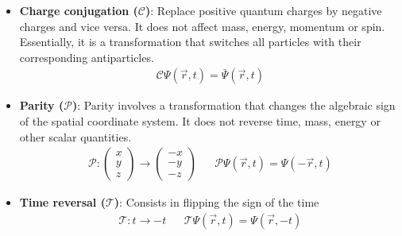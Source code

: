 \begin{itemize}
	\item \textbf{Charge conjugation ($\mathcal{C}$)}: Replace positive quantum charges by negative charges and vice versa. %
										It does not affect mass, energy, momentum or spin. Essentially, it is a transformation that switches
										all particles with their corresponding antiparticles.
										\begin{align*}
											\mathcal{C} \Psi(\overrightarrow{r}, t) = \bar{\Psi}(\overrightarrow{r}, t)
										\end{align*}
										 
	\item \textbf{Parity ($\mathcal{P}$)}: Parity involves a transformation that changes the algebraic sign of the spatial coordinate system. 
								It does not reverse time, mass, energy or other scalar quantities.
								\begin{align*}
									\mathcal{P}:\begin{pmatrix} x \\ y \\ z \end{pmatrix} \rightarrow \begin{pmatrix} -x \\ -y \\ -z \end{pmatrix} &&
									\mathcal{P} \Psi(\overrightarrow{r}, t) = \Psi(-\overrightarrow{r}, t)
								\end{align*}
	\item \textbf{Time reversal ($\mathcal{T}$)}: Consists in flipping the sign of the time
								\begin{align*}
									\mathcal{T}:t \rightarrow -t &&
									\mathcal{T} \Psi (\overrightarrow{r}, t) = \Psi (\overrightarrow{r}, -t)
 								\end{align*}
\end{itemize}


